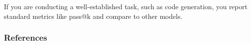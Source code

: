 If you are conducting a well-established task, such as code generation, you \should report standard metrics like pass@k and compare to other models.


\subsubsection{References}












